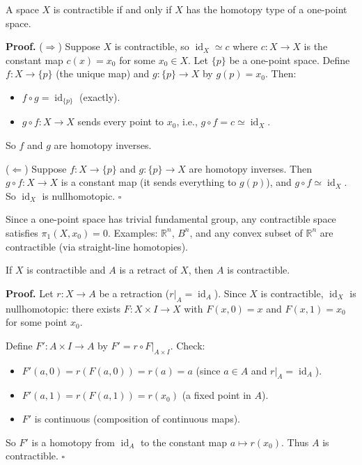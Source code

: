 \documentclass[11pt]{report}
\renewenvironment{proof}[1][Proof]{\noindent\textbf{#1.} }{\hfill$\square$\par\vspace{5pt}}
\begin{document}
\begin{thmbox}
A space $X$ is contractible if and only if $X$ has the homotopy type of a one-point space.
\end{thmbox}

\begin{proof}
($\Rightarrow$) Suppose $X$ is contractible, so $\operatorname{id}_X \simeq c$ where $c: X \to X$ is the constant map $c(x) = x_0$ for some $x_0 \in X$. Let $\{p\}$ be a one-point space. Define $f: X \to \{p\}$ (the unique map) and $g: \{p\} \to X$ by $g(p) = x_0$. Then:
\begin{itemize}[nosep]
    \item $f \circ g = \operatorname{id}_{\{p\}}$ (exactly).
    \item $g \circ f: X \to X$ sends every point to $x_0$, i.e., $g \circ f = c \simeq \operatorname{id}_X$.
\end{itemize}
So $f$ and $g$ are homotopy inverses.

($\Leftarrow$) Suppose $f: X \to \{p\}$ and $g: \{p\} \to X$ are homotopy inverses. Then $g \circ f: X \to X$ is a constant map (it sends everything to $g(p)$), and $g \circ f \simeq \operatorname{id}_X$. So $\operatorname{id}_X$ is nullhomotopic.
\end{proof}

\begin{rembox}
Since a one-point space has trivial fundamental group, any contractible space satisfies $\pi_1(X, x_0) = 0$. Examples: $\mathbb{R}^n$, $B^n$, and any convex subset of $\mathbb{R}^n$ are contractible (via straight-line homotopies).
\end{rembox}

\begin{propbox}
If $X$ is contractible and $A$ is a retract of $X$, then $A$ is contractible.
\end{propbox}

\begin{proof}
Let $r: X \to A$ be a retraction ($r|_A = \operatorname{id}_A$). Since $X$ is contractible, $\operatorname{id}_X$ is nullhomotopic: there exists $F: X \times I \to X$ with $F(x, 0) = x$ and $F(x, 1) = x_0$ for some point $x_0$.

Define $F': A \times I \to A$ by $F' = r \circ F|_{A \times I}$. Check:
\begin{itemize}[nosep]
    \item $F'(a, 0) = r(F(a, 0)) = r(a) = a$ (since $a \in A$ and $r|_A = \operatorname{id}_A$).
    \item $F'(a, 1) = r(F(a, 1)) = r(x_0)$ (a fixed point in $A$).
    \item $F'$ is continuous (composition of continuous maps).
\end{itemize}
So $F'$ is a homotopy from $\operatorname{id}_A$ to the constant map $a \mapsto r(x_0)$. Thus $A$ is contractible.
\end{proof}
\end{document}
